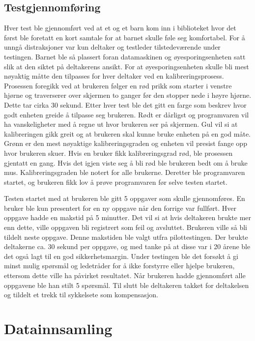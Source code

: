 \subsection{Testgjennomføring} 
Hver test ble gjennomført ved at et og et barn kom inn i biblioteket hvor det først ble foretatt en kort 
samtale for at barnet skulle føle seg komfortabel. For å unngå distraksjoner var kun deltaker og testleder 
tilstedeværende under testingen. Barnet ble så plassert foran datamaskinen og øyesporingsenheten satt slik at den siktet på deltakerens ansikt. For at øyesporingsenheten skulle bli mest nøyaktig måtte den tilpasses for hver deltaker ved en kalibreringsprosess. Prosessen foregikk ved at brukeren følger en rød prikk som starter i 
venstre hjørne og traverserer over skjermen to ganger før den stopper nede i høyre hjørne. Dette 
tar cirka 30 sekund. Etter hver test ble det gitt en farge som beskrev hvor godt enheten greide å 
tilpasse seg brukeren. Rødt er dårligst og programvaren vil ha vanskeligheter med å regne ut hvor 
brukeren ser på skjermen. Gul vil si at kalibreringen gikk greit og at brukeren skal kunne bruke 
enheten på en god måte. Grønn er den mest nøyaktige kalibreringsgraden og enheten vil presist 
fange opp hvor brukeren skuer. Hvis en bruker fikk kalibreringsgrad rød, ble prosessen gjentatt en 
gang. Hvis det igjen viste seg å bli rød ble brukeren bedt om å bruke mus. Kalibreringsgraden ble 
notert for alle brukerne. Deretter ble programvaren startet, og brukeren fikk lov å prøve programvaren før selve testen startet. 
 
 
Testen startet med at brukeren ble  gitt 5 oppgaver som skulle gjennomføres. En bruker ble kun presentert for en ny oppgave når den forrige var fullført. Hver oppgave hadde en makstid på 5 minutter. Det vil si at hvis deltakeren brukte mer enn dette, ville oppgaven bli registrert som feil og avsluttet. Brukeren ville så bli tildelt neste oppgave. Denne makstiden ble valgt utfra pilottestingen. Der brukte deltakerne ca. 30 sekund per oppgave, og med tanke på at disse var i 20 årene ble det også lagt til en god sikkerhetsmargin. Under testingen ble det forsøkt å gi minst mulig spørsmål og ledetråder for å ikke forstyrre eller hjelpe brukeren, ettersom dette ville ha påvirket resultatet. Når brukeren hadde gjennomført alle oppgavene ble han stilt 5 spørsmål. Til slutt ble deltakeren takket for deltakelsen og tildelt et trekk til sykkelsete som kompensasjon. 
 
 
\section{Datainnsamling} 
 
